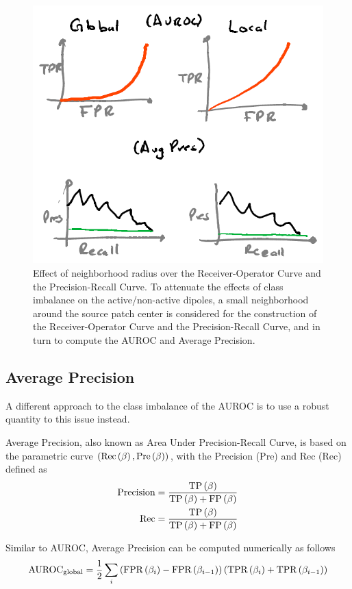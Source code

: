 \begin{figure}
\centering
\includegraphics[width=0.8\linewidth]{./img_dev/nsCurves4}
\caption{Effect of neighborhood radius over the Receiver-Operator Curve and the Precision-Recall Curve. To attenuate the effects of class imbalance on the active/non-active dipoles, a small neighborhood around the source patch center is considered for the construction of the Receiver-Operator Curve and the Precision-Recall Curve, and in turn to compute the AUROC and Average Precision.}
\end{figure}

\subsection{Average Precision}

A different approach to the class imbalance of the AUROC is to use a robust quantity to this issue instead.

Average Precision, also known as Area Under Precision-Recall Curve, is based on the parametric curve 
$\left( \text{Rec}\left( \beta \right), \text{Pre}\left( \beta \right) \right)$, with the Precision (Pre) and Rec (Rec) defined as
\begin{align}
\text{Precision}
&=
\frac{ \text{TP}\left( \beta \right) }{\text{TP}\left( \beta \right) + \text{FP}\left( \beta \right)}
\\
\text{Rec}
&=
\frac{ \text{TP}\left( \beta \right) }{\text{TP}\left( \beta \right) + \text{FP}\left( \beta \right)}
\end{align}

Similar to AUROC, Average Precision can be computed numerically as follows
\begin{equation}
\text{AUROC}_\text{global} =
\frac{1}{2}
\sum_{i}
\left(  \text{FPR}\left( \beta_i \right)-\text{FPR}\left( \beta_{i-1} \right)  \right)
\left(  \text{TPR}\left( \beta_i \right)+\text{TPR}\left( \beta_{i-1} \right)  \right)
\end{equation}

